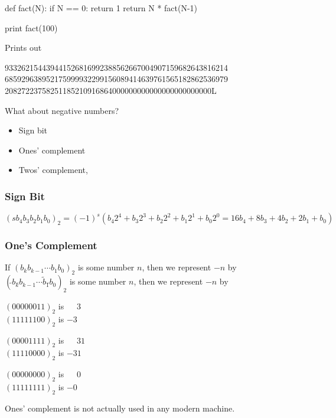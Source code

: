 \begin{frame}[fragile]
\begin{python}
def fact(N):
     if N == 0: return 1
     return N * fact(N-1)

print  fact(100)
\end{python}

Prints out

933262154439441526816992388562667004907159682643816214\\
685929638952175999932299156089414639761565182862536979\\
20827223758251185210916864000000000000000000000000L

\end{frame}

\begin{frame}[fragile]

What about negative numbers?

\end{frame}

\begin{frame}[fragile]

\begin{itemize}
\item Sign bit
\item Ones' complement
\item Twos' complement,
\end{itemize}
\end{frame}

\begin{frame}[fragile]
\frametitle{Sign Bit}

$(s b_4 b_3 b_2 b_1 b_0)_2 = (-1)^s \left(b_4 2^4 + b_3 2^3 + b_2 2^2 + b_1 2^1 + b_0 2^0 = 16b_4 + 8b_3 + 4b_2 + 2 b_1 + b_0\right)$

\end{frame}

\begin{frame}[fragile]
\frametitle{One's Complement}

If $(b_k b_{k-1}\cdots b_1 b_0)_2$ is some number $n$, then we represent $-n$ by\\
$(\tilde{}b_k \tilde{}b_{k-1}\cdots \tilde b_1 \tilde{} b_0)_2$ is some number $n$, then we represent $-n$ by

\pause

$(00000011)_2$ is $\phantom{-}3$\\
$(11111100)_2$ is $-3$

\bigskip

$(00001111)_2$ is $\phantom{-}31$\\
$(11110000)_2$ is $-31$

\bigskip

$(00000000)_2$ is $\phantom{-}0$\\
$(11111111)_2$ is $-0$


\pause

Ones' complement is not actually used in any modern machine.

\end{frame}

